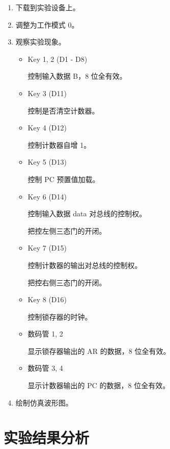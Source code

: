 \begin{enumerate}
    
    \item 下载到实验设备上。
    \item 调整为工作模式 0。
    \item 观察实验现象。
    
    \begin{itemize}
        \item Key 1, 2 (D1 - D8)
        
        控制输入数据 B，8 位全有效。
        
        \item Key 3 (D11)
        
        控制是否清空计数器。
        
        \item Key 4 (D12)
        
        控制计数器自增 1。
        
        \item Key 5 (D13)
        
        控制 PC 预置值加载。
        
        \item Key 6 (D14)
        
        控制输入数据 data 对总线的控制权。
        
        把控左侧三态门的开闭。
        
        \item Key 7 (D15)
        
        控制计数器的输出对总线的控制权。

        把控右侧三态门的开闭。
        
        \item Key 8 (D16)
        
        控制锁存器的时钟。
        
        \item 数码管 1, 2
        
        显示锁存器输出的 AR 的数据，8 位全有效。
        
        \item 数码管 3, 4
        
        显示计数器输出的 PC 的数据，8 位全有效。
        
    \end{itemize}
    \item 绘制仿真波形图。
\end{enumerate}


\section{实验结果分析}

